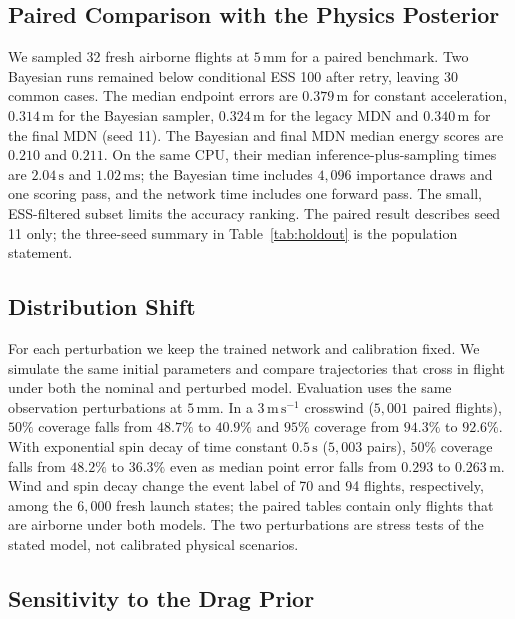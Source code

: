 \documentclass[11pt,a4paper]{article}
\begin{document}
\subsection{Paired Comparison with the Physics Posterior}

We sampled 32 fresh airborne flights at $5\,\mathrm{mm}$ for a paired benchmark. Two Bayesian runs remained below conditional ESS 100 after retry, leaving 30 common cases. The median endpoint errors are $0.379\,\mathrm{m}$ for constant acceleration, $0.314\,\mathrm{m}$ for the Bayesian sampler, $0.324\,\mathrm{m}$ for the legacy MDN and $0.340\,\mathrm{m}$ for the final MDN (seed 11). The Bayesian and final MDN median energy scores are $0.210$ and $0.211$. On the same CPU, their median inference-plus-sampling times are $2.04\,\mathrm{s}$ and $1.02\,\mathrm{ms}$; the Bayesian time includes $4{,}096$ importance draws and one scoring pass, and the network time includes one forward pass. The small, ESS-filtered subset limits the accuracy ranking. The paired result describes seed 11 only; the three-seed summary in Table~\ref{tab:holdout} is the population statement.

\subsection{Distribution Shift}
\label{sec:shift}

For each perturbation we keep the trained network and calibration fixed. We simulate the same initial parameters and compare trajectories that cross in flight under both the nominal and perturbed model. Evaluation uses the same observation perturbations at $5\,\mathrm{mm}$. In a $3\,\mathrm{m\,s^{-1}}$ crosswind ($5{,}001$ paired flights), $50\%$ coverage falls from $48.7\%$ to $40.9\%$ and $95\%$ coverage from $94.3\%$ to $92.6\%$. With exponential spin decay of time constant $0.5\,\mathrm{s}$ ($5{,}003$ pairs), $50\%$ coverage falls from $48.2\%$ to $36.3\%$ even as median point error falls from $0.293$ to $0.263\,\mathrm{m}$. Wind and spin decay change the event label of 70 and 94 flights, respectively, among the $6{,}000$ fresh launch states; the paired tables contain only flights that are airborne under both models. The two perturbations are stress tests of the stated model, not calibrated physical scenarios.

\subsection{Sensitivity to the Drag Prior}
\end{document}
